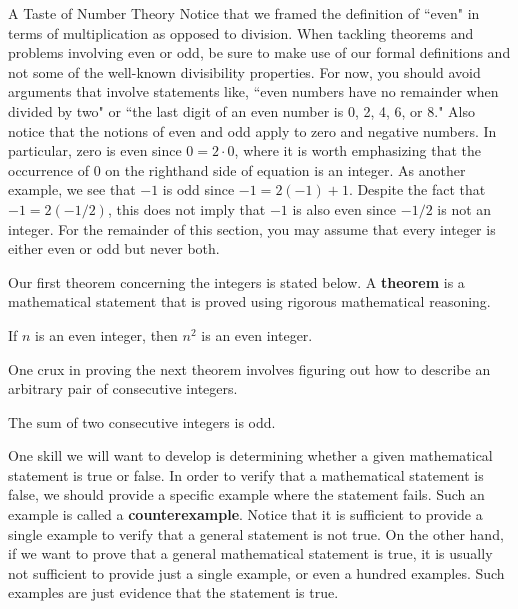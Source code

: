 \begin{section}{A Taste of Number Theory}
Notice that we framed the definition of ``even" in terms of multiplication as opposed to division. When tackling theorems and problems involving even or odd, be sure to make use of our formal definitions and not some of the well-known divisibility properties.  For now, you should avoid arguments that involve statements like, ``even numbers have no remainder when divided by two" or ``the last digit of an even number is 0, 2, 4, 6, or 8." Also notice that the notions of even and odd apply to zero and negative numbers.  In particular, zero is even since $0=2\cdot 0$, where it is worth emphasizing that the occurrence of $0$ on the righthand side of equation is an integer.  As another example, we see that $-1$ is odd since $-1=2(-1)+1$.  Despite the fact that $-1=2(-1/2)$, this does not imply that $-1$ is also even since $-1/2$ is not an integer. For the remainder of this section, you may assume that every integer is either even or odd but never both. %

Our first theorem concerning the integers is stated below.  A \textbf{theorem} is a mathematical statement that is proved using rigorous mathematical reasoning. 

\begin{theorem}\label{thm:n even implies n^2 even}
If $n$ is an even integer, then $n^2$ is an even integer.
\end{theorem}

One crux in proving the next theorem involves figuring out how to describe an arbitrary pair of consecutive integers.

\begin{theorem}\label{thm:two consecutive ints}
The sum of two consecutive integers is odd.
\end{theorem}

One skill we will want to develop is determining whether a given mathematical statement is true or false.  In order to verify that a mathematical statement is false, we should provide a specific example where the statement fails. Such an example is called a \textbf{counterexample}.  Notice that it is sufficient to provide a single example to verify that a general statement is not true.  On the other hand, if we want to prove that a general mathematical statement is true, it is usually not sufficient to provide just a single example, or even a hundred examples.  Such examples are just evidence that the statement is true.


\end{section}
